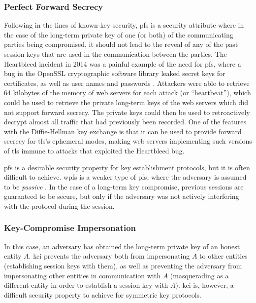 \subsubsection{Perfect Forward Secrecy}

Following in the lines of known-key security, \gls{pfs} is a security attribute where in the case of the long-term private key of one (or both) of the communicating parties being compromised, it should not lead to the reveal of any of the past session keys that are used in the communication between the parties. The Heartbleed incident in 2014 was a painful example of the need for \gls{pfs}, where a bug in the OpenSSL cryptographic software library leaked secret keys for certificates, as well as user names and passwords \cite{durumeric2014matter}. Attackers were able to retrieve 64 kilobytes of the memory of web servers for each attack (or ``heartbeat''), which could be used to retrieve the private long-term keys of the web servers which did not support forward secrecy. The private keys could then be used to retroactively decrypt almost all traffic that had previously been recorded. One of the features with the Diffie-Hellman key exchange is that it can be used to provide forward secrecy for \gls{tls}'s ephemeral modes, making web servers implementing such versions of \gls{tls} immune to attacks that exploited the Heartbleed bug.  



\gls{pfs} is a desirable security property for key establishment protocols, but it is often difficult to achieve. \gls{wpfs} is a weaker type of \gls{pfs}, where the adversary is assumed to be \emph{passive} \cite{krawczyk2005hmqv}. In the case of a long-term key compromise, previous sessions are guaranteed to be secure, but only if the adversary was not actively interfering with the protocol during the session. 

\subsubsection{Key-Compromise Impersonation}

In this case, an adversary has obtained the long-term private key of an honest entity $A$. \gls{kci} prevents the adversary both from impersonating $A$ to other entities (establishing session keys with them), as well as preventing the adversary from impersonating other entities in communication with $A$ (masquerading as a different entity in order to establish a session key with $A$). \gls{kci} is, however, a difficult security property to achieve for symmetric key protocols.


